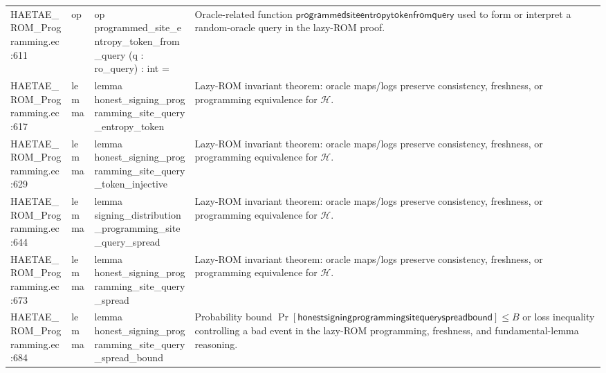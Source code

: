 \documentclass[10pt]{article}
\begin{document}
\begin{longtable}{L{0.11\textwidth}L{0.055\textwidth}L{0.385\textwidth}L{0.41\textwidth}}
HAETAE\_\allowbreak{}ROM\_\allowbreak{}Programming.\allowbreak{}ec:\allowbreak{}611 & op & {\ttfamily\scriptsize op programmed\_\allowbreak{}site\_\allowbreak{}entropy\_\allowbreak{}token\_\allowbreak{}from\_\allowbreak{}query (q : ro\_\allowbreak{}query) : int =} & Oracle-related function $\mathsf{programmedsiteentropytokenfromquery}$ used to form or interpret a random-oracle query in the lazy-ROM proof. \\
HAETAE\_\allowbreak{}ROM\_\allowbreak{}Programming.\allowbreak{}ec:\allowbreak{}617 & lemma & {\ttfamily\scriptsize lemma honest\_\allowbreak{}signing\_\allowbreak{}programming\_\allowbreak{}site\_\allowbreak{}query\_\allowbreak{}entropy\_\allowbreak{}token} & Lazy-ROM invariant theorem: oracle maps/logs preserve consistency, freshness, or programming equivalence for $\mathcal H$. \\
HAETAE\_\allowbreak{}ROM\_\allowbreak{}Programming.\allowbreak{}ec:\allowbreak{}629 & lemma & {\ttfamily\scriptsize lemma honest\_\allowbreak{}signing\_\allowbreak{}programming\_\allowbreak{}site\_\allowbreak{}query\_\allowbreak{}token\_\allowbreak{}injective} & Lazy-ROM invariant theorem: oracle maps/logs preserve consistency, freshness, or programming equivalence for $\mathcal H$. \\
HAETAE\_\allowbreak{}ROM\_\allowbreak{}Programming.\allowbreak{}ec:\allowbreak{}644 & lemma & {\ttfamily\scriptsize lemma signing\_\allowbreak{}distribution\_\allowbreak{}programming\_\allowbreak{}site\_\allowbreak{}query\_\allowbreak{}spread} & Lazy-ROM invariant theorem: oracle maps/logs preserve consistency, freshness, or programming equivalence for $\mathcal H$. \\
HAETAE\_\allowbreak{}ROM\_\allowbreak{}Programming.\allowbreak{}ec:\allowbreak{}673 & lemma & {\ttfamily\scriptsize lemma honest\_\allowbreak{}signing\_\allowbreak{}programming\_\allowbreak{}site\_\allowbreak{}query\_\allowbreak{}spread} & Lazy-ROM invariant theorem: oracle maps/logs preserve consistency, freshness, or programming equivalence for $\mathcal H$. \\
HAETAE\_\allowbreak{}ROM\_\allowbreak{}Programming.\allowbreak{}ec:\allowbreak{}684 & lemma & {\ttfamily\scriptsize lemma honest\_\allowbreak{}signing\_\allowbreak{}programming\_\allowbreak{}site\_\allowbreak{}query\_\allowbreak{}spread\_\allowbreak{}bound} & Probability bound $\Pr[\mathsf{honestsigningprogrammingsitequeryspreadbound}]\le B$ or loss inequality controlling a bad event in the lazy-ROM programming, freshness, and fundamental-lemma reasoning. \\

\end{longtable}
\end{document}
